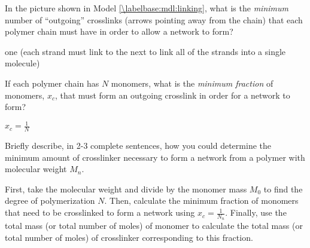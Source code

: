 \begin{activity}
\begin{model}
\end{model}


\begin{ctqs}

	\question In the picture shown in Model \ref{\labelbase:mdl:linking}, what is the \emph{minimum} number of ``outgoing'' crosslinks (arrows pointing away from the chain) that each polymer chain must have in order to allow a network to form?
	
		\begin{solution}[0.5in]
		
			one (each strand must link to the next to link all of the strands into a single molecule)
			
		\end{solution}
		
	\question If each polymer chain has $N$ monomers, what is the \emph{minimum fraction} of monomers, $x_c$, that must form an outgoing crosslink in order for a network to form?
	
		\begin{solution}[0.5in]
			$x_c = \frac{1}{N}$
		\end{solution}
		
	\question Briefly describe, in 2-3 complete sentences, how you could determine the minimum amount of crosslinker necessary to form a network from a polymer with molecular weight $M_n$.
	
		\begin{solution}[2in]
			First, take the molecular weight and divide by the monomer mass $M_0$ to find the degree of polymerization $N$.  Then, calculate the minimum fraction of monomers that need to be crosslinked to form a network using $x_c = \frac{1}{N_n}$.  Finally, use the total mass (or total number of moles) of monomer to calculate the total mass (or total number of moles) of crosslinker corresponding to this fraction.
		\end{solution}
		
	
\end{ctqs}


	

\end{activity}

